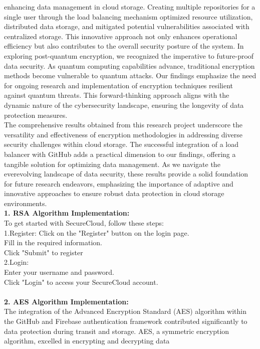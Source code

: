 enhancing data management in cloud storage. Creating multiple repositories for a single user through
the load balancing mechanism optimized resource utilization, distributed data storage, and mitigated
potential vulnerabilities associated with centralized storage. This innovative approach not only
enhances operational efficiency but also contributes to the overall security posture of the system.
In exploring post-quantum encryption, we recognized the imperative to future-proof data security. As
quantum computing capabilities advance, traditional encryption methods become vulnerable to
quantum attacks. Our findings emphasize the need for ongoing research and implementation of
encryption techniques resilient against quantum threats. This forward-thinking approach aligns with
the dynamic nature of the cybersecurity landscape, ensuring the longevity of data protection
measures.\\
The comprehensive results obtained from this research project underscore the versatility and
effectiveness of encryption methodologies in addressing diverse security challenges within cloud
storage. The successful integration of a load balancer with GitHub adds a practical dimension to our
findings, offering a tangible solution for optimizing data management. As we navigate the everevolving landscape of data security, these results provide a solid foundation for future research endeavors, emphasizing the importance of adaptive and innovative approaches to ensure robust data
protection in cloud storage environments.
\\
\textbf{1. RSA Algorithm Implementation:}\\
To get started with SecureCloud, follow these steps:\\
1.Register:
Click on the "Register" button on the login page.\\
Fill in the required information.\\
Click "Submit" to register\\
2.Login:\\
Enter your username and password.\\
Click "Login" to access your SecureCloud account.
\\
\\
\textbf{2. AES Algorithm Implementation:}\\
The integration of the Advanced Encryption Standard (AES) algorithm within the GitHub and
Firebase authentication framework contributed significantly to data protection during transit and
storage. AES, a symmetric encryption algorithm, excelled in encrypting and decrypting data
